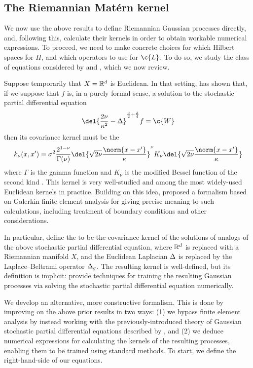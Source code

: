 \documentclass[11pt]{book}
\begin{document}
\subsection{The Riemannian Matérn kernel}

We now use the above results to define Riemannian Gaussian processes directly, and, following this, calculate their kernels in order to obtain workable numerical expressions.
To proceed, we need to make concrete choices for which Hilbert spaces for $H$, and which operators to use for $\c{L}$.
To do so, we study the class of equations considered by \textcite{whittle63} and \textcite{lindgren11}, which we now review.

Suppose temporarily that $X = \mathbb{R}^d$ is Euclidean.
In that setting, \textcite{whittle63} has shown that, if we suppose that $f$ is, in a purely formal sense, a solution to the stochastic partial differential equation
\[
\del{\frac{2\nu}{\kappa^2} - \lap}^{\frac{\nu}{2} + \frac{d}{4}} f = \c{W}
\]
then its covariance kernel must be the 
\[
k_{\nu}(x,x') = \sigma^2 \frac{2^{1-\nu}}{\Gamma(\nu)} \del{\sqrt{2\nu} \frac{\norm{x-x'}}{\kappa}}^\nu K_\nu \del{\sqrt{2\nu} \frac{\norm{x-x'}}{\kappa}}
\]
where $\Gamma$ is the gamma function and $K_\nu$ is the modified Bessel function of the second kind \cite{gradshteyn14}.
This kernel is very well-studied and among the most widely-used Euclidean kernels in practice.
Building on this idea, \textcite{lindgren11} proposed a formalism based on Galerkin finite element analysis for giving precise meaning to such calculations, including treatment of boundary conditions and other considerations.

In particular, \textcite{lindgren11} define the  to be the covariance kernel of the solutions of analogs of the above stochastic partial differential equation, where $\mathbb{R}^d$ is replaced with a Riemannian manifold $X$, and the Euclidean Laplacian $\Delta$ is replaced by the Laplace--Beltrami operator $\Delta_g$.
The resulting kernel is well-defined, but its definition is implicit: \textcite{lindgren11} provide techniques for training the resulting Gaussian processes via solving the stochastic partial differential equation numerically.

We develop an alternative, more constructive formalism.
This is done by improving on the above prior results in two ways: (1) we bypass finite element analysis by instead working with the previously-introduced theory of Gaussian stochastic partial differential equations described by \textcite{lototsky17}, and (2) we deduce numerical expressions for calculating the kernels of the resulting processes, enabling them to be trained using standard methods.
To start, we define the right-hand-side of our equations.
\end{document}
